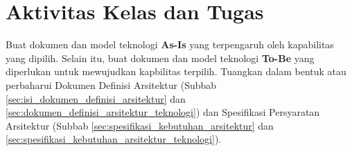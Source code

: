 \section{Aktivitas Kelas dan Tugas}

Buat dokumen dan model teknologi \textbf{As-Is} yang terpengaruh oleh kapabilitas yang dipilih. Selain itu, buat dokumen dan model teknologi \textbf{To-Be} yang diperlukan untuk mewujudkan kapbilitas terpilih. Tuangkan dalam bentuk atau perbaharui Dokumen Definisi Arsitektur (Subbab \ref{sec:isi_dokumen_definisi_arsitektur} dan \ref{sec:dokumen_definisi_arsitektur_teknologi}) dan Spesifikasi Persyaratan Arsitektur (Subbab \ref{sec:spesifikasi_kebutuhan_arsitektur} dan  \ref{sec:spesifikasi_kebutuhan_arsitektur_teknologi}).